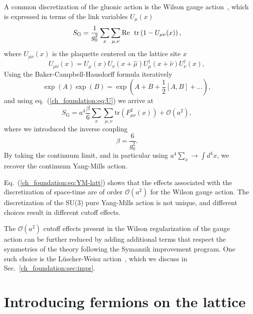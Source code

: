 A common discretization of the gluonic action is the Wilson gauge action~\citep{Wilson:1974sk}, which is expressed in terms of the link variables $U_{\mu}(x)$
\begin{equation}
\label{ch_foundation:eq:SG}
S_{\textrm{G}}=\frac{1}{g_0^2}\sum_x\sum_{\mu,\nu}{\textrm{Re\; tr}}\left(1-U_{\mu\nu}(x)\right),
\end{equation} 
where $U_{\mu\nu}(x)$ is the plaquette centered on the lattice site $x$
\begin{equation}
\label{ch_foundation:eq:plaq}
U_{\mu\nu}(x)=U_{\mu}(x)U_{\nu}(x+\hat{\mu})U_{\mu}^{\dagger}(x+\hat{\nu})U_{\nu}^{\dagger}(x),
\end{equation}
Using the Baker-Campbell-Hausdorff formula iteratively
\begin{equation}
\exp\left(A\right)\exp\left(B\right)=\exp\left(A+B+\frac{1}{2}\left[A,B\right]+...\right),
\end{equation}
and using eq.~(\ref{ch_foundation:eq:U}) we arrive at
\begin{equation}
\label{ch_foundation:eq:YM-latt}
S_{\textrm{G}}=a^4\frac{\beta}{6}\sum_x\sum_{\mu,\nu}{\textrm{tr}}\left(F_{\mu\nu}^2(x)\right)+\mathcal{O}(a^2),
\end{equation}
where we introduced the inverse coupling
\begin{equation}
\beta=\frac{6}{g_0^2}.
\end{equation}
By taking the continuum limit, and in particular using $a^4\sum_x\rightarrow\int d^4x$, we recover the continuum Yang-Mills action.

Eq.~(\ref{ch_foundation:eq:YM-latt}) shows that the effects associated with the discretization of space-time are of order $\mathcal{O}(a^2)$ for the Wilson gauge action. The discretization of the SU(3) pure Yang-Mills action is not unique, and different choices result in different cutoff effects.

The $\mathcal{O}(a^2)$ cutoff effects present in the Wilson regularization of the gauge action can be further reduced by adding additional terms that respect the symmetries of the theory following the Symanzik improvement program. One such choice is the Lüscher-Weisz action~\citep{Luscher:1984xn}, which we discuss in Sec.~\ref{ch_foundation:sec:impr}.



\section{Introducing fermions on the lattice}
\label{ch_foundation:sec:Fermions}

